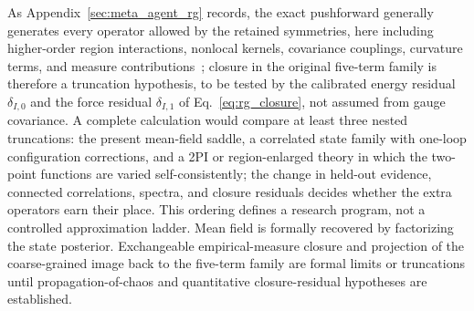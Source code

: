 As Appendix~\ref{sec:meta_agent_rg} records, the exact pushforward generally generates every operator allowed by the retained symmetries, here including higher-order region interactions, nonlocal kernels, covariance couplings, curvature terms, and measure contributions~\cite{Wilson1974}; closure in the original five-term family is therefore a truncation hypothesis, to be tested by the calibrated energy residual $\delta_{I,0}$ and the force residual $\delta_{I,1}$ of Eq.~\eqref{eq:rg_closure}, not assumed from gauge covariance. A complete calculation would compare at least three nested truncations: the present mean-field saddle, a correlated state family with one-loop configuration corrections, and a 2PI or region-enlarged theory in which the two-point functions are varied self-consistently; the change in held-out evidence, connected correlations, spectra, and closure residuals decides whether the extra operators earn their place. This ordering defines a research program, not a controlled approximation ladder. Mean field is formally recovered by factorizing the state posterior. Exchangeable empirical-measure closure and projection of the coarse-grained image back to the five-term family are formal limits or truncations until propagation-of-chaos and quantitative closure-residual hypotheses are established.
